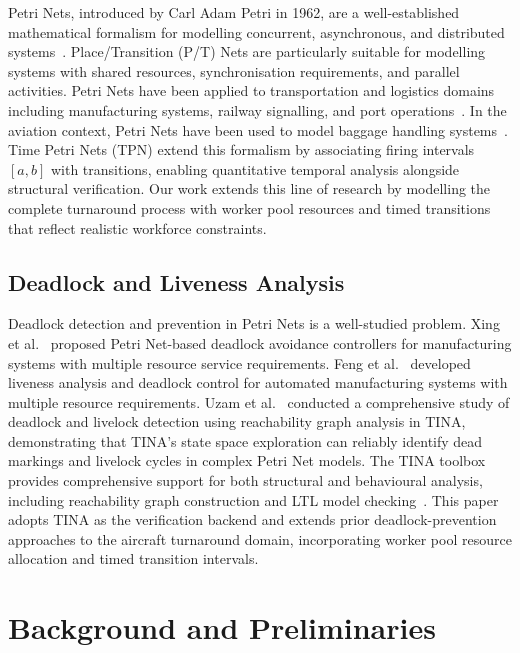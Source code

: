 \documentclass[conference]{IEEEtran}
\begin{document}
Petri Nets, introduced by Carl Adam Petri in 1962, are a well-established
mathematical formalism for modelling concurrent, asynchronous, and distributed
systems~\cite{b7}. Place/Transition (P/T) Nets are particularly suitable for
modelling systems with shared resources, synchronisation requirements, and
parallel activities. Petri Nets have been applied to transportation and logistics
domains including manufacturing systems, railway signalling, and port
operations~\cite{b7}. In the aviation context, Petri Nets have been used to
model baggage handling systems~\cite{b8}. Time Petri Nets (TPN) extend this
formalism by associating firing intervals $[a, b]$ with transitions, enabling
quantitative temporal analysis alongside structural verification. Our
work extends this line of research by modelling the complete turnaround process
with worker pool resources and timed transitions that reflect realistic workforce
constraints.

\subsection{Deadlock and Liveness Analysis}

Deadlock detection and prevention in Petri Nets is a well-studied problem.
Xing et al.~\cite{b4} proposed Petri Net-based deadlock avoidance controllers
for manufacturing systems with multiple resource service requirements. Feng et al.~\cite{b5}
developed liveness analysis and deadlock control for automated manufacturing
systems with multiple resource requirements. Uzam et al.~\cite{b6} conducted a
comprehensive study of deadlock and livelock detection using reachability graph
analysis in TINA, demonstrating that TINA's state space exploration can reliably
identify dead markings and livelock cycles in complex Petri Net models. The TINA
toolbox provides comprehensive support for both structural and behavioural
analysis, including reachability graph construction and LTL model
checking~\cite{b6}. This paper adopts TINA as the verification backend and
extends prior deadlock-prevention approaches to the aircraft turnaround domain,
incorporating worker pool resource allocation and timed transition intervals.


\section{Background and Preliminaries}
\end{document}
